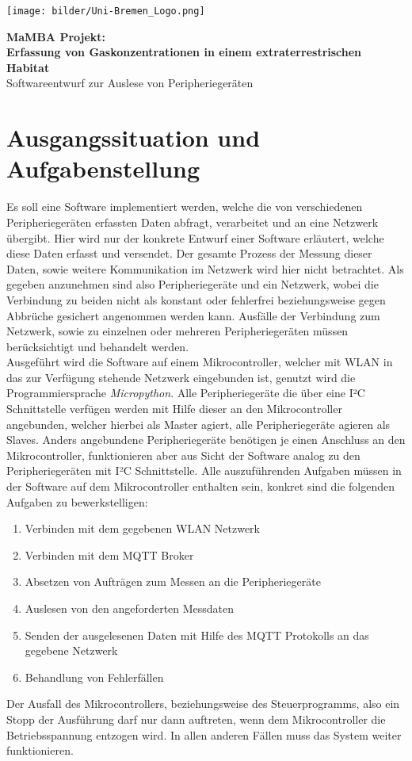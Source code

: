 \documentclass[a4paper, 12pt]{article}
\begin{document}
\begin{multicols}{2}
\texttt{[image: bilder/Uni-Bremen\_Logo.png]}
\\
\end{multicols}
\begin{center}
{\LARGE\bfseries MaMBA Projekt:\\Erfassung von Gaskonzentrationen in einem extraterrestrischen Habitat}
\\
{\Large Softwareentwurf zur Auslese von Peripheriegeräten}
\end{center}
\section{Ausgangssituation und Aufgabenstellung}
Es soll eine Software implementiert werden, welche die von verschiedenen Peripheriegeräten erfassten Daten abfragt, verarbeitet und an eine Netzwerk übergibt. Hier wird nur der konkrete Entwurf einer Software erläutert, welche diese Daten erfasst und versendet. Der gesamte Prozess der Messung dieser Daten, sowie weitere Kommunikation im Netzwerk wird hier nicht betrachtet. Als gegeben anzunehmen sind also Peripheriegeräte und ein Netzwerk, wobei die Verbindung zu beiden nicht als konstant oder fehlerfrei beziehungsweise gegen Abbrüche gesichert angenommen werden kann. Ausfälle der Verbindung zum Netzwerk, sowie zu einzelnen oder mehreren Peripheriegeräten müssen berücksichtigt und behandelt werden.\\

Ausgeführt wird die Software auf einem Mikrocontroller, welcher mit WLAN in das zur Verfügung stehende Netzwerk eingebunden ist, genutzt wird die Programmiersprache \textit{Micropython}. Alle Peripheriegeräte die über eine I²C Schnittstelle verfügen werden mit Hilfe dieser an den Mikrocontroller angebunden, welcher hierbei als Master agiert, alle Peripheriegeräte agieren als Slaves. Anders angebundene Peripheriegeräte benötigen je einen Anschluss an den Mikrocontroller, funktionieren aber aus Sicht der Software analog zu den Peripheriegeräten mit I²C Schnittstelle. Alle auszuführenden Aufgaben müssen in der Software auf dem Mikrocontroller enthalten sein, konkret sind die folgenden Aufgaben zu bewerkstelligen:
\begin{enumerate}
\item Verbinden mit dem gegebenen WLAN Netzwerk
\item Verbinden mit dem MQTT Broker
\item Absetzen von Aufträgen zum Messen an die Peripheriegeräte
\item Auslesen von den angeforderten Messdaten
\item Senden der ausgelesenen Daten mit Hilfe des MQTT Protokolls an das gegebene Netzwerk
\item Behandlung von Fehlerfällen
\end{enumerate}
Der Ausfall des Mikrocontrollers, beziehungsweise des Steuerprogramms, also ein Stopp der Ausführung darf nur dann auftreten, wenn dem Mikrocontroller die Betriebsspannung entzogen wird. In allen anderen Fällen muss das System weiter funktionieren.
\end{document}
